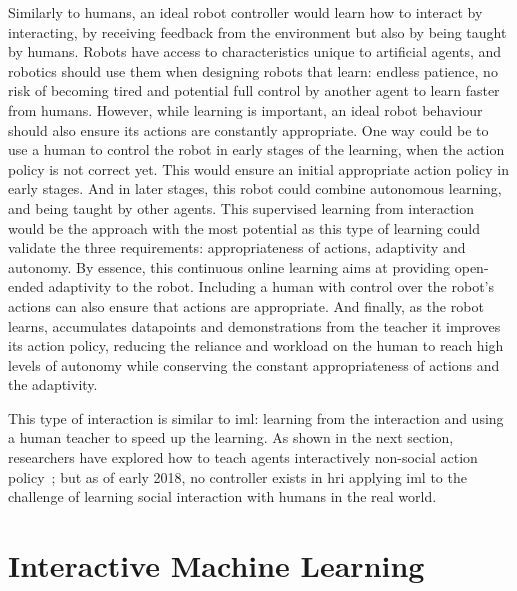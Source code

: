  Similarly to humans, an ideal robot controller would learn how to interact by interacting, by receiving feedback from the environment but also by being taught by humans. Robots have access to characteristics unique to artificial agents, and robotics should use them when designing robots that learn: endless patience, no risk of becoming tired and potential full control by another agent to learn faster from humans. However, while learning is important, an ideal robot behaviour should also ensure its actions are constantly appropriate. One way could be to use a human to control the robot in early stages of the learning, when the action policy is not correct yet. This would ensure an initial appropriate action policy in early stages. And in later stages, this robot could combine autonomous learning, and being taught by other agents.
  This supervised learning from interaction would be the approach with the most potential as this type of learning could validate the three requirements: appropriateness of actions, adaptivity and autonomy. By essence, this continuous online learning aims at providing open-ended adaptivity to the robot. Including a human with control over the robot's actions can also ensure that actions are appropriate. And finally, as the robot learns, accumulates datapoints and demonstrations from the teacher it improves its action policy, reducing the reliance and workload on the human to reach high levels of autonomy while conserving the constant appropriateness of actions and the adaptivity. 

 This type of interaction is similar to \gls{iml}: learning from the interaction and using a human teacher to speed up the learning. As shown in the next section, researchers have explored how to teach agents interactively non-social action policy~\citep{scheutz2017spoken,cakmak2010designing}; but as of early 2018, no controller exists in \gls{hri} applying \gls{iml} to the challenge of learning social interaction with humans in the real world.
  
\section{Interactive Machine Learning} \label{sec:back_iml}

